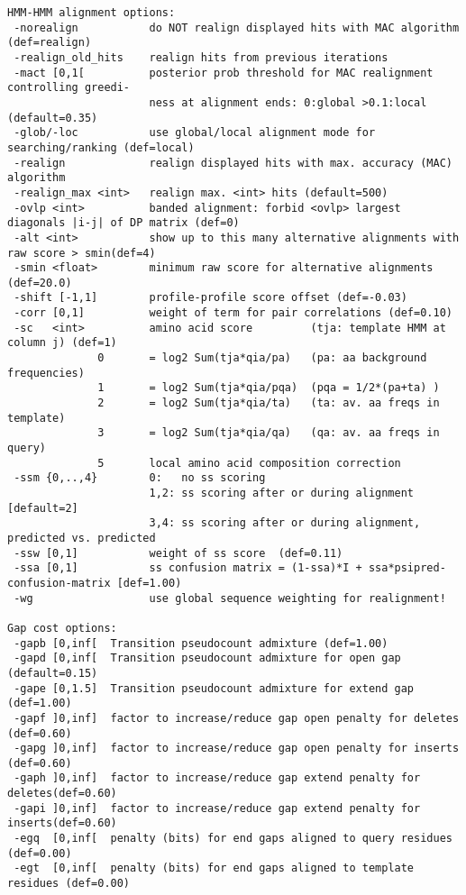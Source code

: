 \documentclass[11pt,a4paper]{article}
\begin{document}
\begin{verbatim}
HMM-HMM alignment options:                                                       
 -norealign           do NOT realign displayed hits with MAC algorithm (def=realign)   
 -realign_old_hits    realign hits from previous iterations                          
 -mact [0,1[          posterior prob threshold for MAC realignment controlling greedi- 
                      ness at alignment ends: 0:global >0.1:local (default=0.35)       
 -glob/-loc           use global/local alignment mode for searching/ranking (def=local)
 -realign             realign displayed hits with max. accuracy (MAC) algorithm 
 -realign_max <int>   realign max. <int> hits (default=500)                        
 -ovlp <int>          banded alignment: forbid <ovlp> largest diagonals |i-j| of DP matrix (def=0)
 -alt <int>           show up to this many alternative alignments with raw score > smin(def=4)  
 -smin <float>        minimum raw score for alternative alignments (def=20.0)  
 -shift [-1,1]        profile-profile score offset (def=-0.03)                         
 -corr [0,1]          weight of term for pair correlations (def=0.10)                
 -sc   <int>          amino acid score         (tja: template HMM at column j) (def=1)
              0       = log2 Sum(tja*qia/pa)   (pa: aa background frequencies)    
              1       = log2 Sum(tja*qia/pqa)  (pqa = 1/2*(pa+ta) )               
              2       = log2 Sum(tja*qia/ta)   (ta: av. aa freqs in template)     
              3       = log2 Sum(tja*qia/qa)   (qa: av. aa freqs in query)        
              5       local amino acid composition correction                     
 -ssm {0,..,4}        0:   no ss scoring                                             
                      1,2: ss scoring after or during alignment  [default=2]         
                      3,4: ss scoring after or during alignment, predicted vs. predicted
 -ssw [0,1]           weight of ss score  (def=0.11)                                  
 -ssa [0,1]           ss confusion matrix = (1-ssa)*I + ssa*psipred-confusion-matrix [def=1.00)
 -wg                  use global sequence weighting for realignment!                   

Gap cost options:                                                                
 -gapb [0,inf[  Transition pseudocount admixture (def=1.00)                     
 -gapd [0,inf[  Transition pseudocount admixture for open gap (default=0.15)    
 -gape [0,1.5]  Transition pseudocount admixture for extend gap (def=1.00)      
 -gapf ]0,inf]  factor to increase/reduce gap open penalty for deletes (def=0.60) 
 -gapg ]0,inf]  factor to increase/reduce gap open penalty for inserts (def=0.60) 
 -gaph ]0,inf]  factor to increase/reduce gap extend penalty for deletes(def=0.60)
 -gapi ]0,inf]  factor to increase/reduce gap extend penalty for inserts(def=0.60)
 -egq  [0,inf[  penalty (bits) for end gaps aligned to query residues (def=0.00) 
 -egt  [0,inf[  penalty (bits) for end gaps aligned to template residues (def=0.00)


\end{verbatim}
\end{document}
